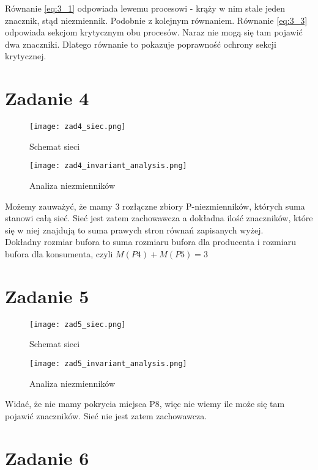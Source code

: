 \documentclass{article}
\begin{document}
Równanie \eqref{eq:3_1} odpowiada lewemu procesowi - krąży w nim stale jeden znacznik, stąd niezmiennik.
Podobnie z kolejnym równaniem. Równanie \eqref{eq:3_3} odpowiada sekcjom krytycznym obu procesów. Naraz nie mogą się tam pojawić dwa znaczniki.
Dlatego równanie to pokazuje poprawność ochrony sekcji krytycznej.

\section{Zadanie 4}

\begin{figure}[H]
\centering
\texttt{[image: zad4\_siec.png]}
\caption{Schemat sieci}
\end{figure}

\begin{figure}[H]
\centering
\texttt{[image: zad4\_invariant\_analysis.png]}
\caption{Analiza niezmienników}
\end{figure}

Możemy zauważyć, że mamy 3 rozłączne zbiory P-niezmienników, których suma stanowi całą sieć. Sieć jest zatem zachowawcza a dokładna ilość znaczników, które się w niej znajdują to suma prawych stron równań zapisanych wyżej. \\
Dokładny rozmiar bufora to suma rozmiaru bufora dla producenta i rozmiaru bufora dla konsumenta, czyli $M(P4) + M(P5) = 3$

\section{Zadanie 5}

\begin{figure}[H]
\centering
\texttt{[image: zad5\_siec.png]}
\caption{Schemat sieci}
\end{figure}

\begin{figure}[H]
\centering
\texttt{[image: zad5\_invariant\_analysis.png]}
\caption{Analiza niezmienników}
\end{figure}

Widać, że nie mamy pokrycia miejsca P8, więc nie wiemy ile może się tam pojawić znaczników. Sieć nie jest zatem zachowawcza.

\section{Zadanie 6}
\end{document}
